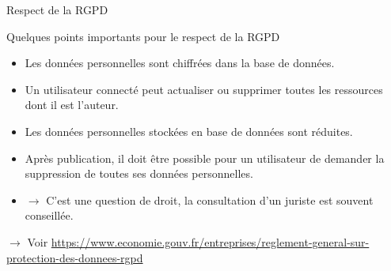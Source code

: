 \begin{frame}{Respect de la RGPD}
  \begin{block}{Quelques points importants pour le respect de la RGPD}
    \begin{itemize}
    \item Les données personnelles sont chiffrées dans la base de données.
    \item Un utilisateur connecté peut actualiser ou supprimer toutes
      les ressources dont il est l'auteur.
    \item Les données personnelles stockées en base de données sont réduites.
    \item Après publication, il doit être possible pour un utilisateur de
      demander la suppression de toutes ses données personnelles.
    \item $\rightarrow$ C'est une question de droit, la consultation
      d'un juriste est souvent conseillée.
    \end{itemize}

    $\rightarrow$ Voir \url{https://www.economie.gouv.fr/entreprises/reglement-general-sur-protection-des-donnees-rgpd}
  \end{block}
\end{frame}

